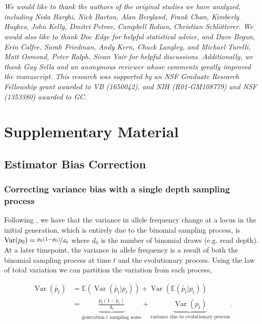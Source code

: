 \documentclass[11pt]{article}
\newcommand{\vb}[1]{{\it \color{blue} #1}}
\newcommand{\beginsupplement}{%
        \setcounter{table}{0}
        \renewcommand{\thetable}{S\arabic{table}}%
        \setcounter{figure}{0}
        \renewcommand{\thefigure}{S\arabic{figure}}%
     }
\newcommand{\E}{\mathbb{E}}
\DeclareMathOperator{\var}{Var}
\providecommand{\DIFaddtex}[1]{{\protect\color{blue}\uwave{#1}}} %
\providecommand{\DIFaddend}{} %
\providecommand{\DIFadd}[1]{\texorpdfstring{\DIFaddtex{#1}}{#1}} %
\begin{document}
\section{\DIFadd{Acknowledgments}} 

\vb{We would like to thank the authors of the original studies we have analyzed,
including Neda Barghi, Nick Barton, Alan Bergland, Frank Chan, Kimberly Hughes,
John Kelly, Dmitri Petrov, Campbell Rolian, Christian Schl{\"o}tterer. We would
also like to thank Doc Edge for helpful statistical advice, and Dave Begun,
Erin Calfee, Sarah Friedman, Andy Kern, Chuck Langley, and Michael Turelli,
Matt Osmond, Peter Ralph, Sivan Yair for helpful discussions. Additionally, we
thank Guy Sella and an anonymous reviewer whose comments greatly improved the
manuscript. This research was supported by an NSF Graduate Research Fellowship
grant awarded to VB (1650042), and NIH (R01-GM108779) and NSF (1353380) awarded
to GC.}

\DIFaddend \printbibliography


\setcounter{section}{1}
\section*{Supplementary Material}
\beginsupplement

\subsection{Estimator Bias Correction}
\subsubsection{Correcting variance bias with a single depth sampling process}
\label{supp:depth-var-corr}

Following \textcite{Waples1989-sj}, we have that the variance in allele
frequency change at a locus in the initial generation, which is entirely due to
the binomial sampling process, is $\var(p_0) = \nicefrac{p_0(1-p_0)}{d_0}$
where $d_0$ is the number of binomial draws (e.g. read depth). At a later
timepoint, the variance in allele frequency is a result of both the binomial
sampling process at time $t$ and the evolutionary process. Using the law of
total variation we can partition the variation from each process,

\begin{align}
  \var(\widetilde{p_t}) &= \E(\var(\widetilde{p_t} | p_t)) + \var(\E(\widetilde{p_t}|p_t)) \\
                        &= \underbrace{\frac{p_t(1-p_t)}{d_t}}_\text{generation $t$ sampling noise} + \underbrace{\var(p_t)}_\text{variance due to evolutionary process}.
\end{align}
\end{document}
